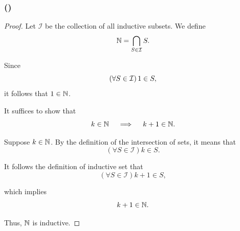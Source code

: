 \newpage
\subsubsection{()}
\begin{proof}
    Let $\mathcal{I }$ be the collection of all inductive subsets. 
    We define 
    \begin{equation*}
        \mathbb{N} = \bigcap_{S \in \mathcal{I}} S. 
    \end{equation*}

    Since 
    \begin{equation*}
        \left(\forall S \in \mathcal{I }\right) 1 \in S, 
    \end{equation*}
    it follows that $1 \in \mathbb{N}$. 

    It suffices to show that 
    \begin{equation*}
        k \in \mathbb{N} \quad \implies \quad k + 1 \in \mathbb{N}. 
    \end{equation*}

    Suppose $k \in \mathbb{N}$. By the definition of the intersection of sets, it means that 
    \begin{equation*}
        (\forall S \in \mathcal{I })k \in S. 
    \end{equation*}

    It follows the definition of inductive set that 
    \begin{equation*}
        (\forall S \in \mathcal{I })k + 1 \in S, 
    \end{equation*} 

    which implies 
    \begin{equation*}
        k + 1 \in \mathbb{N}.  
    \end{equation*}

    Thus, $\mathbb{N}$ is inductive. 
\end{proof}